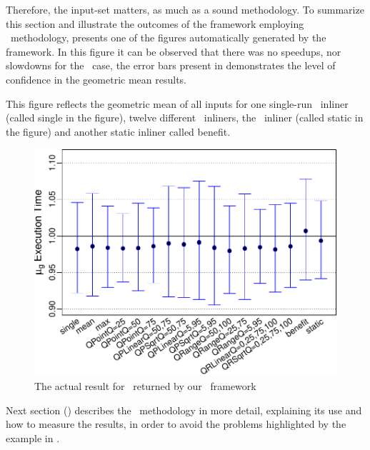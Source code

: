 Therefore, the input-set matters, as much as a sound methodology. To summarize this section and illustrate the outcomes of the framework employing \CP\ methodology,  presents one of the figures automatically generated by the framework. In this figure it can be observed that there was no speedups, nor slowdowns for the \gcc\ case, the error bars present in  demonstrates the level of confidence in the geometric mean results.

This figure reflects the geometric mean of all inputs for one single-run \FDI\ inliner (called single in the figure), twelve different \FDI\ inliners, the \llvm\ inliner (called static in the figure) and another static inliner called benefit.

\begin{figure}
  \centering
  \includegraphics[width=1.00\linewidth]{Figures/gcc-results}
  \caption{The actual result for \gcc\ returned by our \CP\ framework}
  \label{fig:gcc-results}
\end{figure}


Next section () describes the \CP\ methodology in more detail, explaining its use and how to measure the results, in order to avoid the problems highlighted by the example in .
